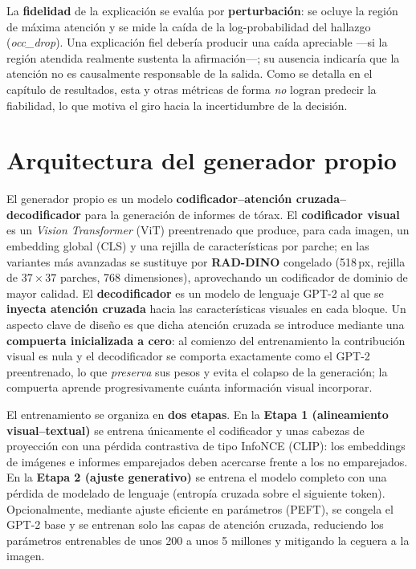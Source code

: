 La \textbf{fidelidad} de la explicación se evalúa por \textbf{perturbación}: se ocluye la región de
máxima atención y se mide la caída de la log-probabilidad del hallazgo (\emph{occ\_drop}). Una
explicación fiel debería producir una caída apreciable —si la región atendida realmente sustenta la
afirmación—; su ausencia indicaría que la atención no es causalmente responsable de la salida. Como se
detalla en el capítulo de resultados, esta y otras métricas de forma \emph{no} logran predecir la
fiabilidad, lo que motiva el giro hacia la incertidumbre de la decisión.

\section{Arquitectura del generador propio}
El generador propio es un modelo \textbf{codificador--atención cruzada--decodificador} para la
generación de informes de tórax. El \textbf{codificador visual} es un \textit{Vision Transformer}
(ViT) preentrenado que produce, para cada imagen, un embedding global (CLS) y una rejilla de
características por parche; en las variantes más avanzadas se sustituye por \textbf{RAD-DINO}
\parencite{perezgarcia2024} congelado (518\,px, rejilla de $37\times37$ parches, 768 dimensiones),
aprovechando un codificador de dominio de mayor calidad. El \textbf{decodificador} es un modelo de
lenguaje GPT-2 al que se \textbf{inyecta atención cruzada} hacia las características visuales en cada
bloque. Un aspecto clave de diseño es que dicha atención cruzada se introduce mediante una
\textbf{compuerta inicializada a cero}: al comienzo del entrenamiento la contribución visual es nula y
el decodificador se comporta exactamente como el GPT-2 preentrenado, lo que \emph{preserva} sus pesos
y evita el colapso de la generación; la compuerta aprende progresivamente cuánta información visual
incorporar.

El entrenamiento se organiza en \textbf{dos etapas}. En la \textbf{Etapa 1 (alineamiento
visual--textual)} se entrena únicamente el codificador y unas cabezas de proyección con una pérdida
contrastiva de tipo InfoNCE (CLIP): los embeddings de imágenes e informes emparejados deben acercarse
frente a los no emparejados. En la \textbf{Etapa 2 (ajuste \mbox{generativo})} se entrena el modelo completo
con una pérdida de modelado de lenguaje (entropía cruzada sobre el siguiente token). Opcionalmente,
mediante ajuste eficiente en parámetros (PEFT), se congela el GPT-2 base y se entrenan solo las capas
de atención cruzada, reduciendo los parámetros entrenables de unos 200 a unos 5 millones y mitigando
la ceguera a la imagen.

